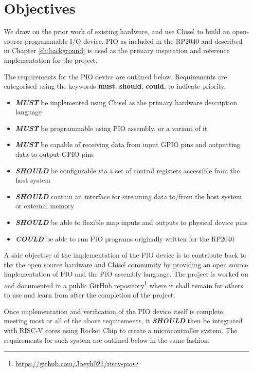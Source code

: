 \chapter{Objectives}
\label{ch:objectives}

We draw on the prior work of existing hardware, and use Chisel to build an open-source programmable I/O device. PIO as included in the RP2040 and described in Chapter \ref{ch:background} is used as the primary inspiration and reference implementation for the project.

The requirements for the PIO device are outlined below. Requirements are categorised using the keywords \textbf{must}, \textbf{should}, \textbf{could}, to indicate priority.

\begin{itemize}
    \item \textit{\textbf{MUST}} be implemented using Chisel as the primary hardware description language
    \item \textit{\textbf{MUST}} be programmable using PIO assembly, or a variant of it
    \item \textit{\textbf{MUST}} be capable of receiving data from input GPIO pins and outputting data to output GPIO pins
    \item \textit{\textbf{SHOULD}} be configurable via a set of control registers accessible from the host system
    \item \textit{\textbf{SHOULD}} contain an interface for streaming data to/from the host system or external memory
    \item \textit{\textbf{SHOULD}} be able to flexible map inputs and outputs to physical device pins
    \item \textit{\textbf{COULD}} be able to run PIO programs originally written for the RP2040
\end{itemize}

A side objective of the implementation of the PIO device is to contribute back to the the open source hardware and Chisel community by providing an open source implementation of PIO and the PIO assembly language. The project is worked on and documented in a public GitHub repository\footnote{\url{https://github.com/Joeyh021/riscv-pio}} where it shall remain for others to use and learn from after the completion of the project.

Once implementation and verification of the PIO device itself is complete, meeting most or all of the above requirements, it \textit{\textbf{SHOULD}} then be integrated with RISC-V cores using Rocket Chip to create a microcontroller system. The requirements for such system are outlined below in the same fashion.

